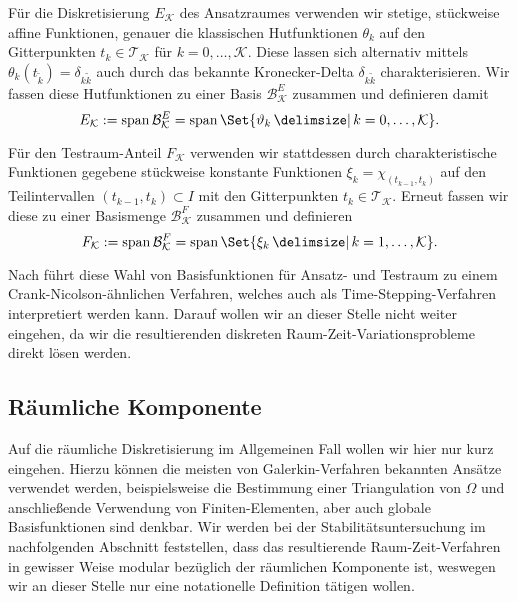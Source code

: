 \documentclass[../main.tex]{subfiles}
\begin{document}
Für die Diskretisierung $E_{\mathcal K}$ des Ansatzraumes verwenden wir stetige, stückweise affine Funktionen, genauer die klassischen Hutfunktionen $\theta_{k}$ auf den Gitterpunkten $t_{k} \in \mathcal T_{\mathcal K}$ für $k = 0, \dots, \mathcal K$.
Diese lassen sich alternativ mittels $\theta_{k}(t_{\tilde{k}}) = \delta_{k \tilde k}$ auch durch das bekannte Kronecker-Delta $\delta_{k \tilde k}$ charakterisieren.
Wir fassen diese Hutfunktionen zu einer Basis $\mathcal B^{E}_{\mathcal K}$ zusammen und definieren damit
\begin{equation}
    \label{eq:zeitanteil_ansatzraum}
    E_{\mathcal K} := \spn \mathcal B^{E}_{\mathcal K} = \spn \Set{ \theta_{k} \given k = 0, \dots, \mathcal K }.
\end{equation}

Für den Testraum-Anteil $F_{\mathcal K}$ verwenden wir stattdessen durch charakteristische Funktionen gegebene stückweise konstante Funktionen $\xi_{k} = \chi_{(t_{k-1}, t_{k})}$ auf den Teilintervallen $(t_{k - 1}, t_{k}) \subset I$ mit den Gitterpunkten $t_{k} \in \mathcal T_{\mathcal K}$.
Erneut fassen wir diese zu einer Basismenge $\mathcal B^{F}_{\mathcal K}$ zusammen und definieren
\begin{equation}
    \label{eq:zeitanteil_testraum}
    F_{\mathcal K} := \spn \mathcal B^{F}_{\mathcal K} = \spn \Set{ \xi_{k} \given k = 1, \dots, \mathcal K}.
\end{equation}

Nach \cite{Andreev:2012ep} führt diese Wahl von Basisfunktionen für Ansatz- und Testraum zu einem Crank-Nicolson-ähnlichen Verfahren, welches auch als Time-Stepping-Verfahren interpretiert werden kann.
Darauf wollen wir an dieser Stelle nicht weiter eingehen, da wir die resultierenden diskreten Raum-Zeit-Variationsprobleme direkt lösen werden.


\subsection*{Räumliche Komponente} %

Auf die räumliche Diskretisierung im Allgemeinen Fall wollen wir hier nur kurz eingehen.
Hierzu können die meisten von Galerkin-Verfahren bekannten Ansätze verwendet werden, beispielsweise die Bestimmung einer Triangulation von $\Omega$ und anschließende Verwendung von Finiten-Elementen, aber auch globale Basisfunktionen sind denkbar.
Wir werden bei der Stabilitätsuntersuchung im nachfolgenden Abschnitt feststellen, dass das resultierende Raum-Zeit-Verfahren in gewisser Weise modular bezüglich der räumlichen Komponente ist, weswegen wir an dieser Stelle nur eine notationelle Definition tätigen wollen.
\end{document}
